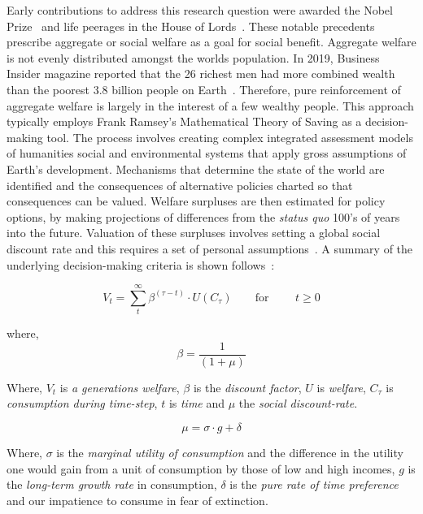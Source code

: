 \documentclass[11pt, oneside]{article}   	%
\begin{document}
Early contributions to address this research question were awarded the Nobel Prize~\cite{np1} and life peerages in the House of Lords~\cite{g1}. These notable precedents prescribe aggregate or social welfare as a goal for social benefit. Aggregate welfare is not evenly distributed amongst the worlds population. In 2019, Business Insider magazine reported that the 26 richest men had more combined wealth than the poorest 3.8 billion people on Earth~\cite{bi1}. Therefore, pure reinforcement of aggregate welfare is largely in the interest of a few wealthy people. This approach typically employs Frank Ramsey's Mathematical Theory of Saving as a decision-making tool. The process involves creating complex integrated assessment models of humanities social and environmental systems that apply gross assumptions of Earth's development. Mechanisms that determine the state of the world are identified and the consequences of alternative policies charted so that consequences can be valued. Welfare surpluses are then estimated for policy options, by making projections of differences from the \emph{status quo} 100's of years into the future. Valuation of these surpluses involves setting a global social discount rate and this requires a set of personal assumptions~\cite{pd2}. A summary of the underlying decision-making criteria is shown follows~\cite{fr1}:

\begin{equation}
V_t = \sum_t^\infty \beta^{(\tau - t)} \cdot U (C_\tau)
\qquad \text{for }
\qquad t \geq 0
\end{equation}

where,
\begin{equation}
\beta = \frac{1}{(1+\mu)}
\end{equation}

Where, $V_t$ is \emph{a generations welfare}, $\beta$ is the \emph{discount factor}, $U$ is \emph{welfare}, $C_\tau$ is \emph{consumption during time-step}, $t$ is \emph{time} and $\mu$ the \emph{social discount-rate}.

\begin{equation}
\mu = \sigma \cdot g + \delta
\end{equation}

Where, $\sigma$ is the \emph{marginal utility of consumption} and the difference in the utility one would gain from a unit of consumption by those of low and high incomes, $g$ is the \emph{long-term growth rate} in consumption, $\delta$ is the \emph{pure rate of time preference} and our impatience to consume in fear of extinction.
\end{document}
